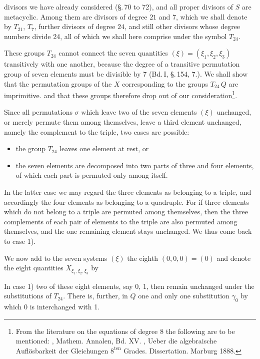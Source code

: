 divisors we have already considered (\S.\,70 to 72), and all proper divisors of $S$ are metacyclic. Among them are divisors of degree $21$ and $7$, which we shall denote by $T_{21}$, $T_7$, further divisors of degree $24$, and still other divisors whose degree numbers divide 24, all of which we shall here comprise under the symbol $T_{24}$.

These groups $T_{24}$ cannot connect the seven quantities $(\xi) = (\xi_1, \xi_2, \xi_3)$ transitively with one another, because the degree of a transitive permutation group of seven elements must be divisible by 7 (Bd.\,I, \S.\,154, 7.). We shall show that the permutation groups of the $X$ corresponding to the groups $T_{24}\,Q$ are imprimitive. %
and that these groups therefore drop out of our consideration\footnote{From the literature on the equations of degree $8$ the following are to be mentioned: , Mathem. Annalen, Bd. XV. , Ueber die algebraische Auflösbarkeit der Gleichungen $8^{\mathrm{ten}}$ Grades. Dissertation. Marburg 1888.}.

Since all permutations $\sigma$ which leave two of the seven elements $(\xi)$ unchanged, or merely permute them among themselves, leave a third element unchanged, namely the complement to the triple, two cases are possible:

\begin{itemize}
\item[1)] the group $T_{24}$ leaves one element at rest, or
\item[2)] the seven elements are decomposed into two parts of three and four elements, of which each part is permuted only among itself.
\end{itemize}

In the latter case we may regard the three elements as belonging to a triple, and accordingly the four elements as belonging to a quadruple. For if three elements which do not belong to a triple are permuted among themselves, then the three complements of each pair of elements to the triple are also permuted among themselves, and the one remaining element stays unchanged. We thus come back to case 1).

We now add to the seven systems $(\xi)$ the eighth $(0,0,0) = (0)$ and denote the eight quantities $X_{\xi_1, \xi_2, \xi_3}$ by


In case 1) two of these eight elements, say 0, 1, then remain unchanged under the substitutions of $T_{24}$. There is, further, in $Q$ one and only one substitution $\gamma_0$ by which 0 is interchanged with 1.
